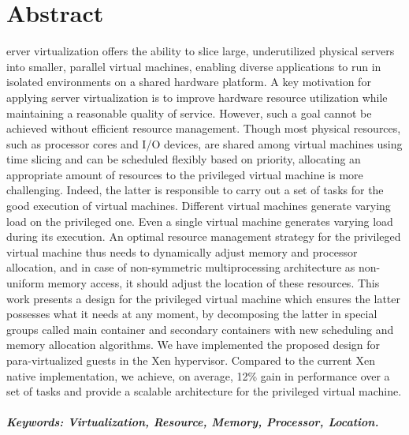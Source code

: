 %
%
%

\chapter*{Abstract}
erver virtualization offers the ability to slice large, underutilized physical servers into smaller, parallel virtual machines, enabling diverse applications to run in isolated environments on a shared hardware platform. A key motivation for applying server virtualization is to improve hardware resource utilization while maintaining a reasonable quality of service. However, such a goal cannot be achieved without efficient resource management. Though most physical resources, such as processor cores and I/O devices, are shared among virtual machines using time slicing and can be scheduled flexibly based on priority, allocating an appropriate amount of resources to the privileged virtual machine is more challenging. Indeed, the latter is responsible to carry out a set of tasks for the good execution of virtual machines. Different virtual machines generate varying load on the privileged one. Even a single virtual machine generates varying load during its execution. An optimal resource management strategy for the privileged virtual machine thus needs to dynamically adjust memory and processor allocation, and in case of non-symmetric multiprocessing architecture as non-uniform memory access, it should adjust the location of these resources. This work presents a design for the privileged virtual machine which ensures the latter possesses what it needs at any moment, by decomposing the latter in special groups called main container and secondary containers with new scheduling and memory allocation algorithms. We have implemented the proposed design for para-virtualized guests in the Xen hypervisor. Compared to the current Xen native implementation, we achieve, on average, 12\% gain in performance over a set of tasks and provide a scalable architecture for the privileged virtual machine. 

\paragraph{Keywords: Virtualization, Resource, Memory, Processor, Location.} 
\clearpage